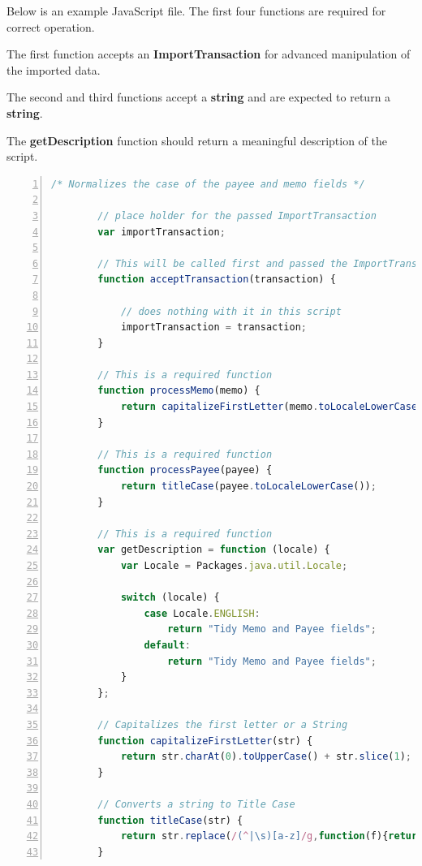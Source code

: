 \documentclass[letterpaper,12pt]{book}
\begin{document}
    \newpage
    Below is an example JavaScript file. The first four functions are required for correct operation.

    The first function accepts an \textbf{ImportTransaction} for advanced manipulation of the imported data.

    The second and third functions accept a \textbf{string} and are expected to return a \textbf{string}.

    The \textbf{getDescription} function should return a meaningful description of the script.
    \\ %
    \begin{lstlisting}[caption={Example Import Script},language=JavaScript,numbers=left]
        /* Normalizes the case of the payee and memo fields */

        // place holder for the passed ImportTransaction
        var importTransaction;

        // This will be called first and passed the ImportTransaction
        function acceptTransaction(transaction) {

            // does nothing with it in this script
            importTransaction = transaction;
        }

        // This is a required function
        function processMemo(memo) {
            return capitalizeFirstLetter(memo.toLocaleLowerCase());
        }

        // This is a required function
        function processPayee(payee) {
            return titleCase(payee.toLocaleLowerCase());
        }

        // This is a required function
        var getDescription = function (locale) {
            var Locale = Packages.java.util.Locale;
    
            switch (locale) {
                case Locale.ENGLISH:
                    return "Tidy Memo and Payee fields";
                default:
                    return "Tidy Memo and Payee fields";
            }
        };

        // Capitalizes the first letter or a String
        function capitalizeFirstLetter(str) {
            return str.charAt(0).toUpperCase() + str.slice(1);
        }

        // Converts a string to Title Case
        function titleCase(str) {
            return str.replace(/(^|\s)[a-z]/g,function(f){return f.toUpperCase();});
        }
    \end{lstlisting}
\end{document}
